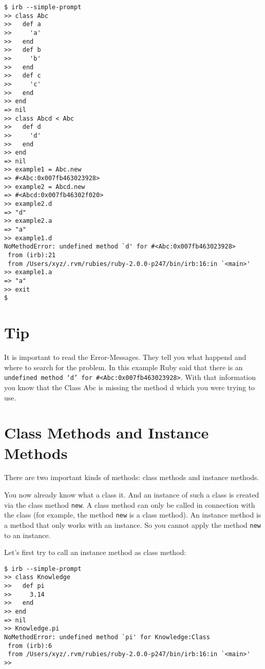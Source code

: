 \documentclass[a4paper]{book}
\begin{document}
\begin{shaded}\begin{verbatim}
$ irb --simple-prompt
>> class Abc
>>   def a
>>     'a'
>>   end
>>   def b
>>     'b'
>>   end
>>   def c
>>     'c'
>>   end
>> end
=> nil
>> class Abcd < Abc
>>   def d
>>     'd'
>>   end
>> end
=> nil
>> example1 = Abc.new
=> #<Abc:0x007fb463023928>
>> example2 = Abcd.new
=> #<Abcd:0x007fb46302f020>
>> example2.d
=> "d"
>> example2.a
=> "a"
>> example1.d
NoMethodError: undefined method `d' for #<Abc:0x007fb463023928>
 from (irb):21
 from /Users/xyz/.rvm/rubies/ruby-2.0.0-p247/bin/irb:16:in `<main>'
>> example1.a
=> "a"
>> exit
$
\end{verbatim}\end{shaded}

\section{Tip}\label{tip-1}

It is important to read the Error-Messages. They tell you what happend and where to search for the problem. In this example Ruby said that there is an \texttt{undefined method `d' for             \#\textless{}Abc:0x007fb463023928\textgreater{}}. With that information you know that the Class Abc is missing the method d which you were trying to use.

\section{Class Methods and Instance Methods}\label{class-methods-and-instance-methods}

There are two important kinds of methods: class methods and instance methods.

You now already know what a class it. And an instance of such a class is created via the class method \texttt{new}. A class method can only be called in connection with the class (for example, the method \texttt{new} is a class method). An instance method is a method that only works with an instance. So you cannot apply the method \texttt{new} to an instance.

Let's first try to call an instance method as class method:

\begin{shaded}\begin{verbatim}
$ irb --simple-prompt
>> class Knowledge
>>   def pi
>>     3.14
>>   end
>> end
=> nil
>> Knowledge.pi
NoMethodError: undefined method `pi' for Knowledge:Class
 from (irb):6
 from /Users/xyz/.rvm/rubies/ruby-2.0.0-p247/bin/irb:16:in `<main>'
>>
\end{verbatim}\end{shaded}
\end{document}
